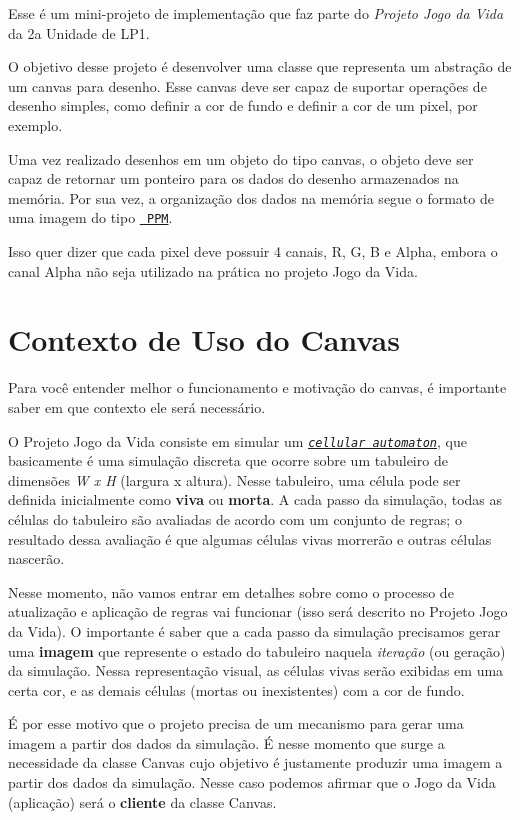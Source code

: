 Esse é um mini-\/projeto de implementação que faz parte do {\itshape Projeto Jogo da Vida} da 2a Unidade de L\+P1.

O objetivo desse projeto é desenvolver uma classe que representa um abstração de um canvas para desenho. Esse canvas deve ser capaz de suportar operações de desenho simples, como definir a cor de fundo e definir a cor de um pixel, por exemplo.

Uma vez realizado desenhos em um objeto do tipo canvas, o objeto deve ser capaz de retornar um ponteiro para os dados do desenho armazenados na memória. Por sua vez, a organização dos dados na memória segue o formato de uma imagem do tipo \href{https://en.wikipedia.org/wiki/Netpbm_format}{\texttt{ P\+PM}}.

Isso quer dizer que cada pixel deve possuir 4 canais, R, G, B e Alpha, embora o canal Alpha não seja utilizado na prática no projeto Jogo da Vida.

\section*{Contexto de Uso do Canvas}

Para você entender melhor o funcionamento e motivação do canvas, é importante saber em que contexto ele será necessário.

O Projeto Jogo da Vida consiste em simular um \href{https://en.wikipedia.org/wiki/Cellular_automaton}{\texttt{ {\itshape cellular automaton}}}, que basicamente é uma simulação discreta que ocorre sobre um tabuleiro de dimensões {\itshape W x H} (largura x altura). Nesse tabuleiro, uma célula pode ser definida inicialmente como {\bfseries{viva}} ou {\bfseries{morta}}. A cada passo da simulação, todas as células do tabuleiro são avaliadas de acordo com um conjunto de regras; o resultado dessa avaliação é que algumas células vivas morrerão e outras células nascerão.

Nesse momento, não vamos entrar em detalhes sobre como o processo de atualização e aplicação de regras vai funcionar (isso será descrito no Projeto Jogo da Vida). O importante é saber que a cada passo da simulação precisamos gerar uma {\bfseries{imagem}} que represente o estado do tabuleiro naquela {\itshape iteração} (ou geração) da simulação. Nessa representação visual, as células vivas serão exibidas em uma certa cor, e as demais células (mortas ou inexistentes) com a cor de fundo.

É por esse motivo que o projeto precisa de um mecanismo para gerar uma imagem a partir dos dados da simulação. É nesse momento que surge a necessidade da classe {\ttfamily Canvas} cujo objetivo é justamente produzir uma imagem a partir dos dados da simulação. Nesse caso podemos afirmar que o Jogo da Vida (aplicação) será o {\bfseries{cliente}} da classe {\ttfamily Canvas}.

